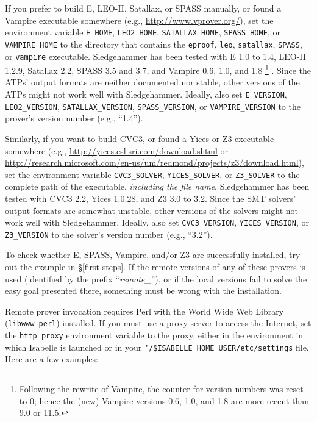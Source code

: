 \documentclass[a4paper,12pt]{article}
\begin{document}
\begin{sloppy}
\begin{enum}
\item[\labelitemi] If you prefer to build E, LEO-II, Satallax, or SPASS
manually, or found a Vampire executable somewhere (e.g.,
\url{http://www.vprover.org/}), set the environment variable \texttt{E\_HOME},
\texttt{LEO2\_HOME}, \texttt{SATALLAX\_HOME}, \texttt{SPASS\_HOME}, or
\texttt{VAMPIRE\_HOME} to the directory that contains the \texttt{eproof},
\texttt{leo}, \texttt{satallax}, \texttt{SPASS}, or \texttt{vampire} executable.
Sledgehammer has been tested with E 1.0 to 1.4, LEO-II 1.2.9, Satallax 2.2,
SPASS 3.5 and 3.7, and Vampire 0.6, 1.0, and 1.8%
\footnote{Following the rewrite of Vampire, the counter for version numbers was
reset to 0; hence the (new) Vampire versions 0.6, 1.0, and 1.8 are more recent
than 9.0 or 11.5.}%
. Since the ATPs' output formats are neither documented nor stable, other
versions of the ATPs might not work well with Sledgehammer. Ideally,
also set \texttt{E\_VERSION}, \texttt{LEO2\_VERSION},
\texttt{SATALLAX\_VERSION}, \texttt{SPASS\_VERSION}, or
\texttt{VAMPIRE\_VERSION} to the prover's version number (e.g., ``1.4'').

Similarly, if you want to build CVC3, or found a
Yices or Z3 executable somewhere (e.g.,
\url{http://yices.csl.sri.com/download.shtml} or
\url{http://research.microsoft.com/en-us/um/redmond/projects/z3/download.html}),
set the environment variable \texttt{CVC3\_\allowbreak SOLVER},
\texttt{YICES\_SOLVER}, or \texttt{Z3\_SOLVER} to the complete path of
the executable, \emph{including the file name}. Sledgehammer has been tested
with CVC3 2.2, Yices 1.0.28, and Z3 3.0 to 3.2.
Since the SMT solvers' output formats are somewhat unstable, other
versions of the solvers might not work well with Sledgehammer. Ideally,
also set \texttt{CVC3\_VERSION}, \texttt{YICES\_VERSION}, or
\texttt{Z3\_VERSION} to the solver's version number (e.g., ``3.2'').
\end{enum}
\end{sloppy}

To check whether E, SPASS, Vampire, and/or Z3 are successfully installed, try
out the example in \S\ref{first-steps}. If the remote versions of any of these
provers is used (identified by the prefix ``\emph{remote\_\/}''), or if the
local versions fail to solve the easy goal presented there, something must be
wrong with the installation.

Remote prover invocation requires Perl with the World Wide Web Library
(\texttt{libwww-perl}) installed. If you must use a proxy server to access the
Internet, set the \texttt{http\_proxy} environment variable to the proxy, either
in the environment in which Isabelle is launched or in your
\texttt{\char`\~/\$ISABELLE\_HOME\_USER/etc/settings} file. Here are a few
examples:
\end{document}
